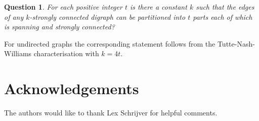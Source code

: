 \documentclass[11pt, reqno, a4paper]{article}
\newtheorem{question}{Question}
\theoremstyle{definition}
\numberwithin{equation}{section}
\begin{document}
\begin{question}
For each positive integer \(t\) is there a constant \(k\) such that the edges of any \(k\)-strongly connected digraph can be partitioned into \(t\) parts each of which is spanning and strongly connected?
\end{question}

For undirected graphs the corresponding statement follows from the Tutte-Nash-Williams characterisation with \(k = 4t\).

\section{Acknowledgements}

The authors would like to thank Lex Schrijver for helpful comments.



\end{document}
